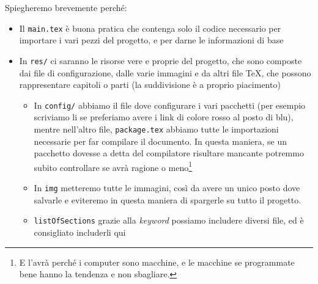 Spiegheremo brevemente perché:
\begin{itemize}
  \item Il \texttt{main.tex} è buona pratica che contenga solo il codice
necessario per importare i vari pezzi del progetto, e per darne le informazioni
di base
  \item In \texttt{res/} ci saranno le risorse vere e proprie del progetto, che
sono composte dai file di configurazione, dalle varie immagini e da altri file
TeX, che possono rappresentare capitoli o parti (la suddivisione è a proprio
piacimento)
  \begin{itemize}
   \item In \texttt{config/} abbiamo il file dove configurare i vari pacchetti
(per esempio scriviamo li se preferiamo avere i link di colore rosso al posto
di blu), mentre nell'altro file, \texttt{package.tex} abbiamo tutte le
importazioni necessarie per far compilare il documento. In questa maniera, se
un pacchetto dovesse a detta del compilatore risultare mancante potremmo subito
controllare se avrà ragione o meno\footnote{E l'avrà perché i computer sono
macchine, e le macchine se programmate bene hanno la tendenza e non sbagliare.}
  \item In \texttt{img} metteremo tutte le immagini, così da avere un unico
posto dove salvarle e eviteremo in questa maniera di spargerle su tutto il
progetto.
  \item \texttt{listOfSections} grazie alla \textit{keyword} \verb!!
possiamo includere diversi file, ed è consigliato includerli qui %
  \end{itemize}

\end{itemize}

